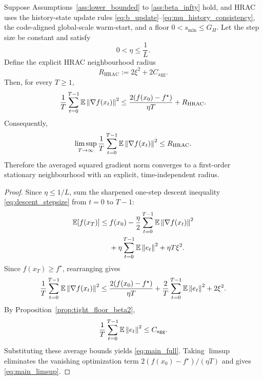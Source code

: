 \begin{theorem}
\label{thm:main}
Suppose Assumptions~\ref{ass:lower_bounded} to \ref{ass:beta_infty} hold, and
HRAC uses the history-state update rules
\eqref{eq:b_update}--\eqref{eq:mu_history_consistency}, the code-aligned
global-scale warm-start, and a floor \(0<s_{\min}\le G_H\).
Let the step size be constant and satisfy
\begin{equation}
    0 < \eta \le \frac{1}{L}.
    \label{eq:stepsize}
\end{equation}
Define the explicit HRAC neighbourhood radius
\begin{equation}
    R_{\mathrm{HRAC}}
    :=
    2\xi^2
    +
    2C_{\mathrm{agg}}.
    \label{eq:R_HRAC}
\end{equation}
Then, for every \(T\ge 1\),
\begin{equation}
    \frac{1}{T}\sum_{t=0}^{T-1}\mathbb{E}\left\lVert \nabla f(x_t) \right\rVert^2
    \le
    \frac{2(f(x_0)-f^\star)}{\eta T}
    +
    R_{\mathrm{HRAC}}.
    \label{eq:main_full}
\end{equation}
Consequently,
\begin{equation}
    \limsup_{T\to\infty}
    \frac{1}{T}\sum_{t=0}^{T-1}\mathbb{E}\left\lVert \nabla f(x_t) \right\rVert^2
    \le
    R_{\mathrm{HRAC}}.
    \label{eq:main_limsup}
\end{equation}
Therefore the averaged squared gradient norm converges to a first-order
stationary neighbourhood with an explicit, time-independent radius.
\end{theorem}

\begin{proof}
Since \(\eta\le1/L\), sum the sharpened one-step descent inequality
\eqref{eq:descent_stepsize} from \(t=0\) to
\(T-1\):
\begin{align*}
    \mathbb{E}[f(x_T)]
    \le\;&
    f(x_0)
    -
    \frac{\eta}{2}\sum_{t=0}^{T-1}\mathbb{E}\left\lVert \nabla f(x_t) \right\rVert^2
    \\
    &+
    \eta\sum_{t=0}^{T-1}\mathbb{E}\left\lVert e_t \right\rVert^2
    +
    \eta T\xi^2.
\end{align*}
Since \(f(x_T)\ge f^\star\), rearranging gives
\[
    \frac{1}{T}\sum_{t=0}^{T-1}\mathbb{E}\left\lVert \nabla f(x_t) \right\rVert^2
    \le
    \frac{2(f(x_0)-f^\star)}{\eta T}
    +
    \frac{2}{T}\sum_{t=0}^{T-1}\mathbb{E}\left\lVert e_t \right\rVert^2
    +
    2\xi^2.
\]
By Proposition~\ref{prop:tight_floor_beta2},
\[
    \frac1T\sum_{t=0}^{T-1}\mathbb{E}\left\lVert e_t \right\rVert^2
    \le
    C_{\mathrm{agg}}.
\]
Substituting these average bounds yields
\eqref{eq:main_full}. Taking \(\limsup\) eliminates the vanishing optimization
term \(2(f(x_0)-f^\star)/(\eta T)\) and gives \eqref{eq:main_limsup}.
\end{proof}

